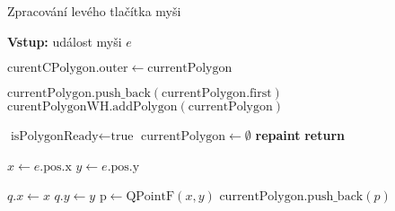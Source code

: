 \begin{algorithm}
    \caption{Zpracování levého tlačítka myši}
    \begin{algorithmic}[1]
        \STATE \textbf{Vstup:} událost myši $e$
        
                \STATE $\text{curentCPolygon}.\text{outer} \gets \text{currentPolygon}$
                
                \STATE $\text{currentPolygon}.\text{push\_back}(\text{currentPolygon}.\text{first})$
                \STATE $\text{curentPolygonWH}.\text{addPolygon}(\text{currentPolygon})$
                
                \STATE $\text{isPolygonReady} \gets \text{true}$
                \STATE $\text{currentPolygon} \gets \emptyset$
            \ENDIF
            \STATE \textbf{repaint}
            \STATE \textbf{return}
        \ENDIF
        
        \STATE $x \gets e.\text{pos}.\text{x}$
        \STATE $y \gets e.\text{pos}.\text{y}$

            \STATE $q.x \gets x$
            \STATE $q.y \gets y$
        \ELSE
            \STATE $\text{p} \gets \text{QPointF}(x, y)$
            \STATE $\text{currentPolygon}.\text{push\_back}(p)$
        \ENDIF
    \end{algorithmic}
\end{algorithm}

